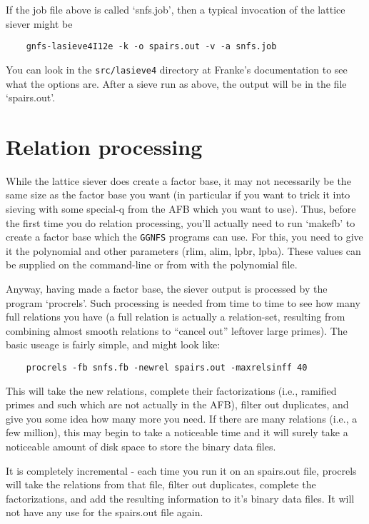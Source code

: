 \documentclass[12pt]{article}
\begin{document}
  If the job file above is called `snfs.job', then a typical invocation of the
  lattice siever might be
  \begin{verbatim}
    gnfs-lasieve4I12e -k -o spairs.out -v -a snfs.job  
  \end{verbatim}
  You can look in the {\tt src/lasieve4} directory at Franke's documentation
  to see what the options are.
  After a sieve run as above, the output will be in the file `spairs.out'.

\section{Relation processing}
  While the lattice siever does create a factor base, it may not necessarily
  be the same size as the factor base you want (in particular if you want to
  trick it into sieving with some special-q from the AFB which you want to
  use). Thus, before the first time you do relation processing, you'll
  actually need to run `makefb' to create a factor base which the {\tt GGNFS}
  programs can use. For this, you need to give it the polynomial and other
  parameters (rlim, alim, lpbr, lpba). These values can be supplied on the
  command-line or from with the polynomial file.

  Anyway, having made a factor base, the siever output is processed by
  the program `procrels'. Such processing is needed from time to time
  to see how many full relations you have (a full relation is actually
  a relation-set, resulting from combining almost smooth relations to
  ``cancel out'' leftover large primes). The basic useage is fairly simple,
  and might look like:
  \begin{verbatim}
    procrels -fb snfs.fb -newrel spairs.out -maxrelsinff 40
  \end{verbatim}
  This will take the new relations, complete their factorizations (i.e.,
  ramified primes and such which are not actually in the AFB), filter
  out duplicates, and give you some idea how many more you need.
  If there are many relations (i.e., a few million), this may begin
  to take a noticeable time and it will surely take a noticeable amount
  of disk space to store the binary data files.

  It is completely incremental - each time you run it on an spairs.out file,
  procrels will take the relations from that file, filter out duplicates,
  complete the factorizations, and add the resulting information to it's
  binary data files. It will not have any use for the spairs.out file again.
\end{document}
